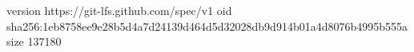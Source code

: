 version https://git-lfs.github.com/spec/v1
oid sha256:1eb8758ee9e28b5d4a7d24139d464d5d32028db9d914b01a4d8076b4995b555a
size 137180
